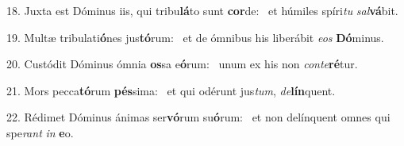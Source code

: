 18. Juxta est Dóminus iis, qui tribu\textbf{lá}to sunt \textbf{cor}de: \ast\  et húmiles spíri\textit{tu} \textit{sal}\textbf{vá}bit.\

19. Multæ tribulati\textbf{ó}nes jus\textbf{tó}rum: \ast\  et de ómnibus his liberábit \textit{e}\textit{os} \textbf{Dó}minus.\

20. Custódit Dóminus ómnia \textbf{os}sa e\textbf{ó}rum: \ast\  unum ex his non \textit{con}\textit{te}\textbf{ré}tur.\

21. Mors pecca\textbf{tó}rum \textbf{pés}sima: \ast\  et qui odérunt jus\textit{tum}, \textit{de}\textbf{lín}quent.\

22. Rédimet Dóminus ánimas ser\textbf{vó}rum su\textbf{ó}rum: \ast\  et non delínquent omnes qui spe\textit{rant} \textit{in} \textbf{e}o.\

